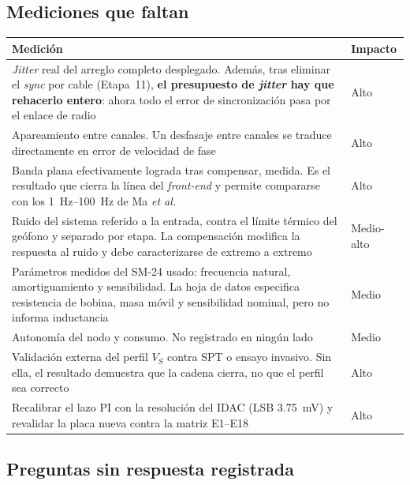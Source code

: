\subsection{Mediciones que faltan}

\begin{center}\small
\begin{tabularx}{\textwidth}{@{}X l@{}}
\toprule
\textbf{Medici\'on} & \textbf{Impacto} \\
\midrule
\emph{Jitter} real del arreglo completo desplegado. Adem\'as, tras eliminar el \emph{sync} por cable (Etapa~11), \textbf{el presupuesto de \emph{jitter} hay que rehacerlo entero}: ahora todo el error de sincronizaci\'on pasa por el enlace de radio & Alto \\
\addlinespace[2pt]
Apareamiento entre canales. Un desfasaje entre canales se traduce directamente en error de velocidad de fase & Alto \\
\addlinespace[2pt]
Banda plana efectivamente lograda tras compensar, medida. Es el resultado que cierra la l\'inea del \emph{front-end} y permite compararse con los \SIrange{1}{100}{\hertz} de Ma \emph{et al.} & Alto \\
\addlinespace[2pt]
Ruido del sistema referido a la entrada, contra el l\'imite t\'ermico del ge\'ofono y separado por etapa. La compensaci\'on modifica la respuesta al ruido y debe caracterizarse de extremo a extremo & Medio-alto \\
\addlinespace[2pt]
Par\'ametros medidos del SM-24 usado: frecuencia natural, amortiguamiento y sensibilidad. La hoja de datos especifica resistencia de bobina, masa m\'ovil y sensibilidad nominal, pero no informa inductancia & Medio \\
\addlinespace[2pt]
Autonom\'ia del nodo y consumo. No registrado en ning\'un lado & Medio \\
\addlinespace[2pt]
Validaci\'on externa del perfil $V_S$ contra SPT o ensayo invasivo. Sin ella, el resultado demuestra que la cadena cierra, no que el perfil sea correcto & Alto \\
\addlinespace[2pt]
Recalibrar el lazo PI con la resoluci\'on del IDAC (LSB \SI{3.75}{\milli\volt}) y revalidar la placa nueva contra la matriz E1--E18 & Alto \\
\bottomrule
\end{tabularx}
\end{center}

\subsection{Preguntas sin respuesta registrada}

